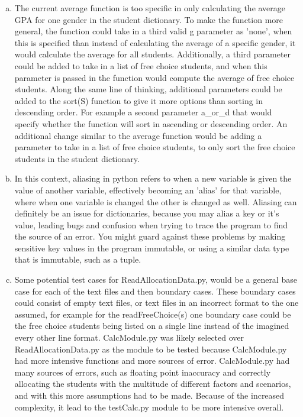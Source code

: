 \documentclass[12pt]{article}
\begin{document}
\begin{enumerate}[(a)]

\item The current average function is too specific in only calculating the average GPA for one gender in the student dictionary. To make the function more general, the function could take in a third valid g parameter as 'none', when this is specified than instead of calculating the average of a specific gender, it would calculate the average for all students. Additionally, a third parameter could be added to take in a list of free choice students, and when this parameter is passed in the function would compute the average of free choice students. Along the same line of thinking, additional parameters could be added to the sort(S) function to give it more options than sorting in descending order. For example a second parameter a\_or\_d that would specify whether the function will sort in ascending or descending order. An additional change similar to the average function would be adding a parameter to take in a list of free choice students, to only sort the free choice students in the student dictionary.

\item In this context, aliasing in python refers to when a new variable is given the value of another variable, effectively becoming an 'alias' for that variable, where when one variable is changed the other is changed as well. Aliasing can definitely be an issue for dictionaries, because you may alias a key or it's value, leading bugs and confusion when trying to trace the program to find the source of an error. You might guard against these problems by making sensitive key values in the program immutable, or using a similar data type that is immutable, such as a tuple.


\item Some potential test cases for ReadAllocationData.py, would be a general base case for each of the text files and then boundary cases. These boundary cases could consist of empty text files, or text files in an incorrect format to the one assumed, for example for the readFreeChoice(s) one boundary case could be the free choice students being listed on a single line instead of the imagined every other line format. CalcModule.py was likely selected over ReadAllocationData.py as the module to be tested because CalcModule.py had more intensive functions and more sources of error. CalcModule.py had many sources of errors, such as floating point inaccuracy and correctly allocating the students with the multitude of different factors and scenarios, and with this more assumptions had to be made. Because of the increased complexity, it lead to the testCalc.py module to be more intensive overall.


\end{enumerate}
\end{document}
